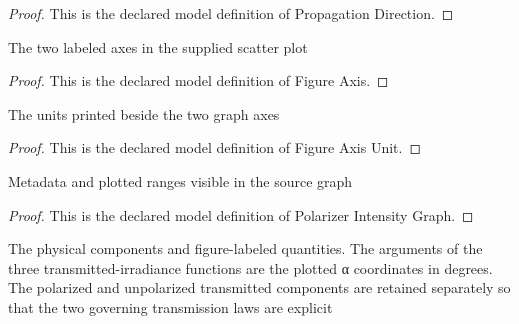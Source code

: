 \begin{proof}
  This is the declared model definition of Propagation Direction.
\end{proof}
\begin{definition}
  \label{def:physics:phyx-mini-0105:phyxminiproblems-problemphyxmini0105-figureaxis}
  The two labeled axes in the supplied scatter plot
\end{definition}
\begin{proof}
  This is the declared model definition of Figure Axis.
\end{proof}
\begin{definition}
  \label{def:physics:phyx-mini-0105:phyxminiproblems-problemphyxmini0105-figureaxisunit}
  The units printed beside the two graph axes
\end{definition}
\begin{proof}
  This is the declared model definition of Figure Axis Unit.
\end{proof}
\begin{definition}
  \label{def:physics:phyx-mini-0105:phyxminiproblems-problemphyxmini0105-polarizerintensitygraph}
  Metadata and plotted ranges visible in the source graph
\end{definition}
\begin{proof}
  This is the declared model definition of Polarizer Intensity Graph.
\end{proof}
\begin{definition}
  \label{def:physics:phyx-mini-0105:phyxminiproblems-problemphyxmini0105-mixedbeampolarizersetup}
  The physical components and figure-labeled quantities. The arguments of the three transmitted-irradiance functions are the plotted α coordinates in degrees. The polarized and unpolarized transmitted components are retained separately so that the two governing transmission laws are explicit
\end{definition}
